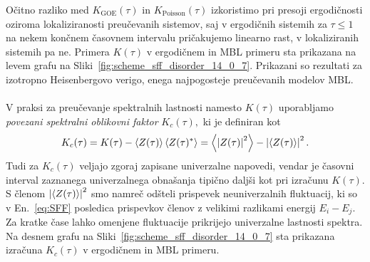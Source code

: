 Očitno razliko med $K_\mathrm{GOE}(\tau)$ in $K_\mathrm{Poisson}(\tau)$ izkoristimo pri presoji ergodičnosti oziroma lokaliziranosti preučevanih sistemov, saj v ergodičnih sistemih za $\tau\leq1$ na nekem končnem časovnem intervalu pričakujemo linearno rast, v lokaliziranih sistemih pa ne. Primera $K(\tau)$ v ergodičnem in MBL primeru sta prikazana na levem grafu na Sliki~\ref{fig:scheme_sff_disorder_14_0_7}. Prikazani so rezultati za izotropno Heisenbergovo verigo, enega najpogosteje preučevanih modelov MBL.\\\\
V praksi za preučevanje spektralnih lastnosti namesto $K(\tau)$ uporabljamo \emph{povezani spektralni oblikovni faktor} $K_c(\tau),$ ki je definiran kot~\cite{chen2017universal} 
\begin{equation}\label{eq:SFF_connected}
K_c(\tau)=K(\tau) - \left\langle Z(\tau) \right\rangle \left\langle Z(\tau)^*\right\rangle=\left\langle \left| Z(\tau) \right|^2 \right\rangle - \left| \left\langle Z(\tau)\right\rangle \right|^2.
\end{equation}
Tudi za $K_c(\tau)$ veljajo zgoraj zapisane univerzalne napovedi, vendar je časovni interval zaznanega univerzalnega obnašanja tipično daljši kot pri izračunu $K(\tau).$ S členom $\left| \left\langle Z(\tau)\right\rangle \right|^2$ smo namreč odšteli prispevek neuniverzalnih fluktuacij, ki so v En.~\eqref{eq:SFF} posledica prispevkov členov z velikimi razlikami energij $E_i-E_j.$ Za kratke čase lahko omenjene fluktuacije prikrijejo univerzalne lastnosti spektra. Na desnem grafu na Sliki~\ref{fig:scheme_sff_disorder_14_0_7} sta prikazana izračuna $K_c(\tau)$ v ergodičnem in MBL primeru. 
